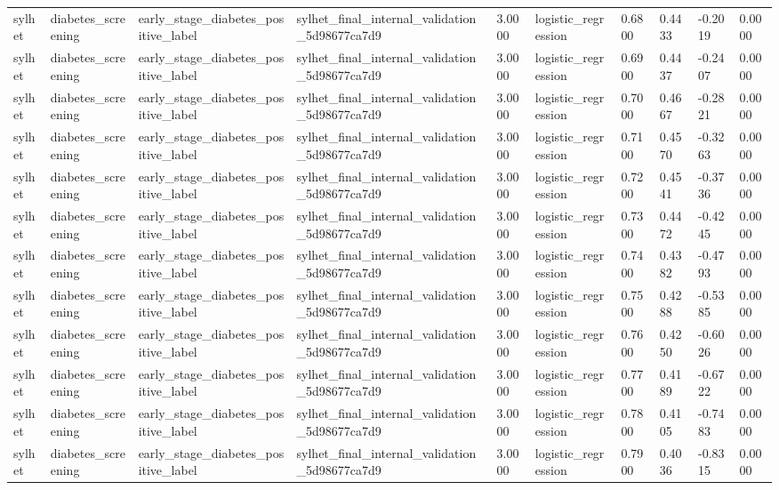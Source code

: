 \begin{tabular}{llllllllll}
sylhet & diabetes\_screening & early\_stage\_diabetes\_positive\_label & sylhet\_final\_internal\_validation\_5d98677ca7d9 & 3.0000 & logistic\_regression & 0.6800 & 0.4433 & -0.2019 & 0.0000 \\
sylhet & diabetes\_screening & early\_stage\_diabetes\_positive\_label & sylhet\_final\_internal\_validation\_5d98677ca7d9 & 3.0000 & logistic\_regression & 0.6900 & 0.4437 & -0.2407 & 0.0000 \\
sylhet & diabetes\_screening & early\_stage\_diabetes\_positive\_label & sylhet\_final\_internal\_validation\_5d98677ca7d9 & 3.0000 & logistic\_regression & 0.7000 & 0.4667 & -0.2821 & 0.0000 \\
sylhet & diabetes\_screening & early\_stage\_diabetes\_positive\_label & sylhet\_final\_internal\_validation\_5d98677ca7d9 & 3.0000 & logistic\_regression & 0.7100 & 0.4570 & -0.3263 & 0.0000 \\
sylhet & diabetes\_screening & early\_stage\_diabetes\_positive\_label & sylhet\_final\_internal\_validation\_5d98677ca7d9 & 3.0000 & logistic\_regression & 0.7200 & 0.4541 & -0.3736 & 0.0000 \\
sylhet & diabetes\_screening & early\_stage\_diabetes\_positive\_label & sylhet\_final\_internal\_validation\_5d98677ca7d9 & 3.0000 & logistic\_regression & 0.7300 & 0.4472 & -0.4245 & 0.0000 \\
sylhet & diabetes\_screening & early\_stage\_diabetes\_positive\_label & sylhet\_final\_internal\_validation\_5d98677ca7d9 & 3.0000 & logistic\_regression & 0.7400 & 0.4382 & -0.4793 & 0.0000 \\
sylhet & diabetes\_screening & early\_stage\_diabetes\_positive\_label & sylhet\_final\_internal\_validation\_5d98677ca7d9 & 3.0000 & logistic\_regression & 0.7500 & 0.4288 & -0.5385 & 0.0000 \\
sylhet & diabetes\_screening & early\_stage\_diabetes\_positive\_label & sylhet\_final\_internal\_validation\_5d98677ca7d9 & 3.0000 & logistic\_regression & 0.7600 & 0.4250 & -0.6026 & 0.0000 \\
sylhet & diabetes\_screening & early\_stage\_diabetes\_positive\_label & sylhet\_final\_internal\_validation\_5d98677ca7d9 & 3.0000 & logistic\_regression & 0.7700 & 0.4189 & -0.6722 & 0.0000 \\
sylhet & diabetes\_screening & early\_stage\_diabetes\_positive\_label & sylhet\_final\_internal\_validation\_5d98677ca7d9 & 3.0000 & logistic\_regression & 0.7800 & 0.4105 & -0.7483 & 0.0000 \\
sylhet & diabetes\_screening & early\_stage\_diabetes\_positive\_label & sylhet\_final\_internal\_validation\_5d98677ca7d9 & 3.0000 & logistic\_regression & 0.7900 & 0.4036 & -0.8315 & 0.0000 \\

\end{tabular}
